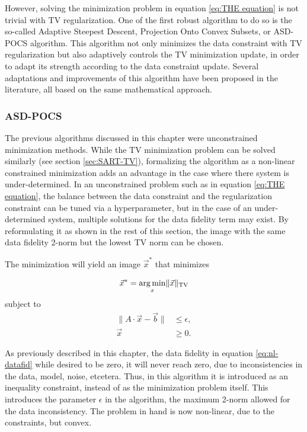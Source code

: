However, solving the minimization problem in equation \ref{eq:THE equation} is not trivial with TV regularization. One of the first robust algorithm to do so is the so-called Adaptive Steepest Descent, Projection Onto Convex Subsets, or ASD-POCS algorithm\cite{ASD_POCS}. This algorithm not only minimizes the data constraint with TV regularization but also adaptively controls the TV minimization update, in order to adapt its strength according to the data constraint update. Several adaptations and improvements of this algorithm have been proposed in the literature\cite{liu2012adaptive}\cite{tian2011low}\cite{liu2013nonparametric}, all based on the same mathematical approach.  


\subsubsection{ASD-POCS}

The previous algorithms discussed in this chapter were unconstrained minimization methods. While the TV minimization problem can be solved similarly (see section \ref{sec:SART-TV}), formalizing the algorithm as a non-linear constrained minimization adds an advantage in the case where there system is under-determined. In an unconstrained problem such as in equation \ref{eq:THE equation}, the balance between the data constraint and the regularization constraint can be tuned via a hyperparameter, but in the case of an under-determined system, multiple solutions for the data fidelity term may exist. By reformulating it as shown in the rest of this section, the image with the same data fidelity 2-norm but the lowest TV norm can be chosen.

The minimization will yield an image $\vec{x}^*$ that minimizes 

\begin{equation}
\vec{x}^*= \mathop{\mathrm{arg\,min}}_x \lVert \vec{x} \rVert_\text{TV}
\end{equation}
subject to 
\begin{align}
\lVert A\cdot \vec{x}-\vec{b}\rVert &\leq \epsilon,\label{eq:nl-datafid}\\
\vec{x}&\geq 0.
\end{align}

As previously described in this chapter, the data fidelity in equation \ref{eq:nl-datafid} while desired to be zero, it will never reach zero, due to inconsistencies in the data, model, noise, etcetera. Thus, in this algorithm it is introduced as an inequality constraint, instead of as the minimization problem itself. This introduces the parameter $\epsilon$ in the algorithm, the maximum 2-norm allowed for the data inconsistency. The problem in hand is now non-linear, due to the constraints, but convex.

